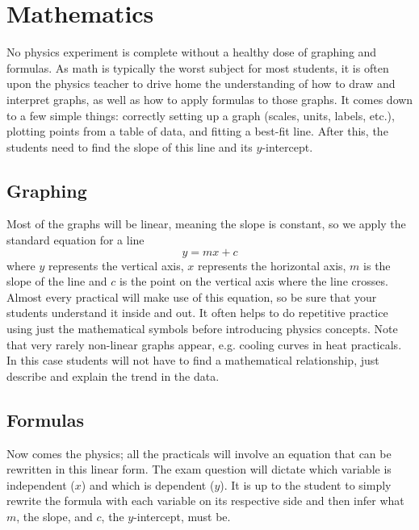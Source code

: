 

\section{Mathematics}

No physics experiment is complete without a healthy dose of graphing and
formulas. As math is typically the worst subject for most students, it is often upon the
physics teacher to drive home the understanding of how to draw and interpret graphs, as
well as how to apply formulas to those graphs. It comes down to a few simple things:
correctly setting up a graph (scales, units, labels, etc.), plotting points from a table of
data, and fitting a best-fit line. After this, the students need to find the slope of this line
and its $y$-intercept.

\subsection{Graphing}
Most of the graphs will be linear, meaning the slope is constant, so we apply the standard
equation for a line
$$y=mx + c$$
where $y$ represents the vertical axis, $x$ represents the horizontal axis, $m$ is the slope of the line and $c$ is the point on the vertical axis where the line crosses. Almost every practical will make use of this equation, so be sure that your students understand it inside and out. It often helps to do repetitive practice using just the mathematical symbols before introducing physics concepts. Note that very rarely non-linear graphs appear, e.g. cooling curves in heat practicals. In this case students will not have to find a mathematical relationship, just describe and explain the trend in the data.

\subsection{Formulas}
Now comes the physics; all the practicals will involve an equation that can be
rewritten in this linear form. The exam question will dictate which variable is
independent ($x$) and which is dependent ($y$). It is up to the student to simply rewrite the
formula with each variable on its respective side and then infer what $m$, the slope, and $c$,
the $y$-intercept, must be.


